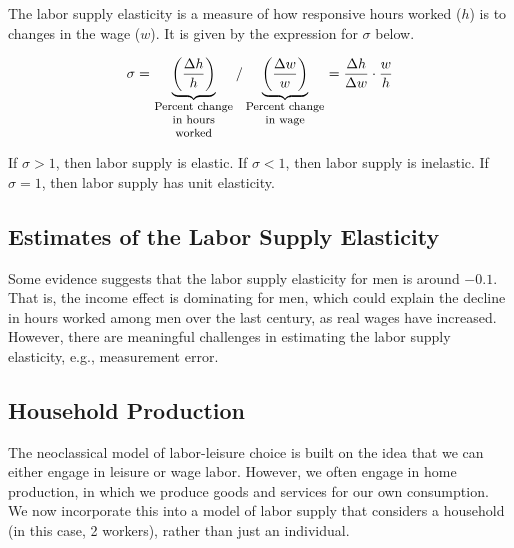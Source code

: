 \begin{definition} 

    The labor supply elasticity is 
    a measure of how responsive hours worked ($h$) 
    is to changes in the wage ($w$). 
    It is given by the expression for $\sigma$ below.
    
    \begin{align}
        \sigma= \underbrace{\left(\frac{\Delta h}{h}\right)}_{\parbox[t]{2cm}{\raggedright \footnotesize \centering Percent change in hours worked}} / \underbrace{\left(\frac{\Delta w}{w}\right)}_{\parbox[t]{2cm}{\raggedright \footnotesize \centering Percent change in wage}} =\frac{\Delta h}{\Delta w} \cdot \frac{w}{h}
    \end{align}

\end{definition}

\begin{definition} 
    
    If $\sigma > 1$, then labor supply is elastic.
    If $\sigma < 1$, then labor supply is inelastic.
    If $\sigma = 1$, then labor supply has unit elasticity.

\end{definition}

\subsection{Estimates of the Labor Supply Elasticity}

Some evidence suggests that the labor supply elasticity
for men is around $-0.1$. That is, the income effect is 
dominating for men, which could explain the decline in hours 
worked among men over the last century, as real wages have increased.
However, there are meaningful challenges in estimating the
labor supply elasticity, e.g.,
measurement error. 

\subsection{Household Production}

The neoclassical model of labor-leisure choice
is built on the idea that we can either engage in 
leisure or wage labor. However, we often 
engage in home production, in which we 
produce goods and services for our own consumption.
We now incorporate this into a model of labor supply
that considers a household (in this case, 2 workers), 
rather than just an individual.

